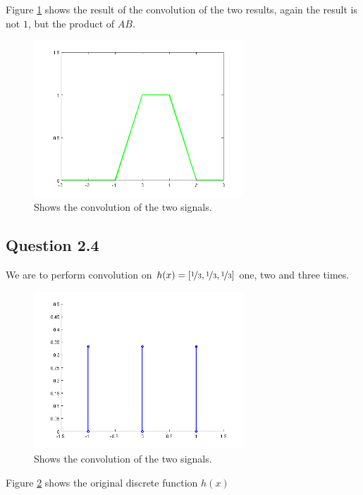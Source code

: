 \documentclass[a4paper, 10pt, final]{article}
\begin{document}
Figure \ref{fig:q2_3c} shows the result of the convolution of the two
results, again the result is not $1$, but the product of $AB$.

\begin{figure}[!ht]
  \centering
  \includegraphics[width=0.7\textwidth]{./images/q2_3c}
  \caption{Shows the convolution of the two signals.}
    \label{fig:q2_3c}
\end{figure}

\subsection*{Question 2.4}

We are to perform convolution on $h(x) = [\nicefrac{1}{3}, \nicefrac{1}{3}, \nicefrac{1}{3}]$ one, two and three times.

\begin{figure}[!ht]
  \centering
  \includegraphics[width=0.7\textwidth]{./images/q2_4a}
  \caption{Shows the convolution of the two signals.}
    \label{fig:q2_4a}
\end{figure}

Figure \ref{fig:q2_4a} shows the original discrete function $h(x)$
\end{document}
